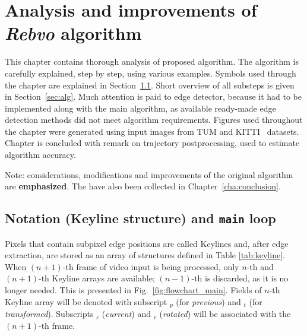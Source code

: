 \chapter{Analysis and improvements of \textit{Rebvo} algorithm}
\label{cha:intro2}

This chapter contains thorough analysis of proposed algorithm. The algorithm is carefully explained, step by step, using various examples. Symbols used through the chapter are explained in Section~\ref{sec:struct}. Short overview of all substeps is given in Section~\ref{sec:alg}. Much attention is paid to edge detector, because it had to be implemented along with the main algorithm, as available ready-made edge detection methods did not meet algorithm requirements. Figures used throughout the chapter were generated using input images from TUM \cite{tum} and KITTI~\cite{kitti} datasets. Chapter is concluded with remark on trajectory postprocessing, used to estimate algorithm accuracy.

Note: considerations, modifications and improvements of the original algorithm are \textbf{emphasized}. The have also been collected in Chapter~\ref{cha:conclusion}.

\section{Notation (Keyline structure) and {\tt main} loop}
\label{sec:struct}

Pixels that contain subpixel edge positions are called Keylines and, after edge extraction, are stored as an array of structures defined in Table \ref{tab:keyline}. When $(n+1)$-th frame of video input is being processed, only $n$-th and $(n+1)$-th Keyline arrays are available; $(n-1)$-th is discarded, as it is no longer needed. This is presented in Fig.~\ref{fig:flowchart_main}. Fields of $n$-th Keyline array will be denoted with subscript $_{p}$ (for \textit{previous}) and $_{t}$ (for \textit{transformed}). Subscripts $_{c}$ (\textit{current}) and $_{r}$ (\textit{rotated}) will be associated with the $(n+1)$-th frame.

